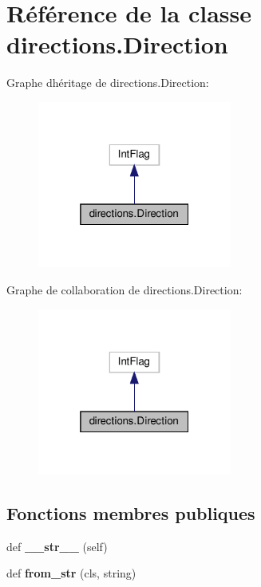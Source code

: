 \hypertarget{classdirections_1_1Direction}{}\section{Référence de la classe directions.\+Direction}
\label{classdirections_1_1Direction}


Graphe d\textquotesingle{}héritage de directions.\+Direction\+:
\nopagebreak
\begin{figure}[H]
\begin{center}
\leavevmode
\includegraphics[width=181pt]{classdirections_1_1Direction__inherit__graph}
\end{center}
\end{figure}


Graphe de collaboration de directions.\+Direction\+:
\nopagebreak
\begin{figure}[H]
\begin{center}
\leavevmode
\includegraphics[width=181pt]{classdirections_1_1Direction__coll__graph}
\end{center}
\end{figure}
\subsection*{Fonctions membres publiques}
\begin{DoxyCompactItemize}
\item 
\mbox{\label{classdirections_1_1Direction_aba6a03a0ea2b8173c63b7961f12ab28b}} 
def {\bfseries \+\_\+\+\_\+str\+\_\+\+\_\+} (self)
\item 
\mbox{\label{classdirections_1_1Direction_ad3605045e9180a055012bcb7a99df303}} 
def {\bfseries from\+\_\+str} (cls, string)
\end{DoxyCompactItemize}
